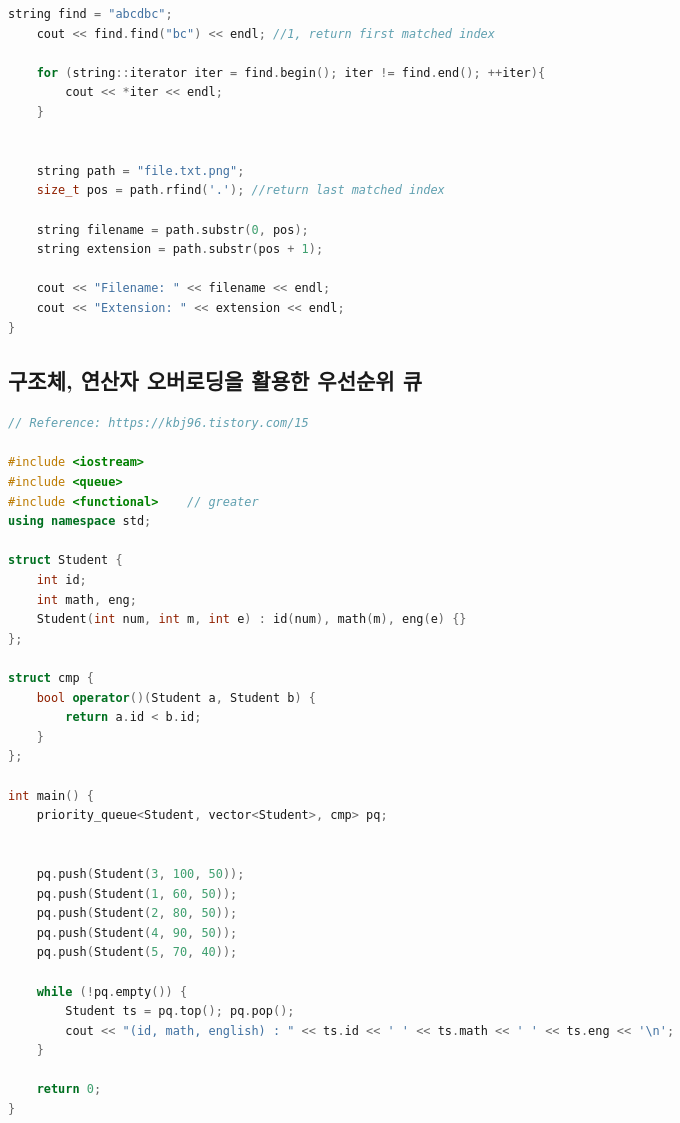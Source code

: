 \documentclass[]{article}
\begin{document}
\begin{multicols*}{2}
\begin{lstlisting}[language=c++]
    string find = "abcdbc";
    cout << find.find("bc") << endl; //1, return first matched index

    for (string::iterator iter = find.begin(); iter != find.end(); ++iter){
        cout << *iter << endl;
    }


    string path = "file.txt.png";
    size_t pos = path.rfind('.'); //return last matched index

    string filename = path.substr(0, pos);
    string extension = path.substr(pos + 1);

    cout << "Filename: " << filename << endl;
    cout << "Extension: " << extension << endl;
}
\end{lstlisting}
\subsection{구조체, 연산자 오버로딩을 활용한 우선순위 큐}
\begin{lstlisting}[language=c++]
// Reference: https://kbj96.tistory.com/15

#include <iostream>
#include <queue>
#include <functional>    // greater
using namespace std;
 
struct Student {
    int id;
    int math, eng;
    Student(int num, int m, int e) : id(num), math(m), eng(e) {}
};
 
struct cmp {
    bool operator()(Student a, Student b) {
        return a.id < b.id;
    }
};
 
int main() {
    priority_queue<Student, vector<Student>, cmp> pq;  
 
 
    pq.push(Student(3, 100, 50));
    pq.push(Student(1, 60, 50));
    pq.push(Student(2, 80, 50));
    pq.push(Student(4, 90, 50));
    pq.push(Student(5, 70, 40));
    
    while (!pq.empty()) {
        Student ts = pq.top(); pq.pop();
        cout << "(id, math, english) : " << ts.id << ' ' << ts.math << ' ' << ts.eng << '\n';
    }
 
    return 0;
}
\end{lstlisting}
\end{multicols*}
\end{document}
